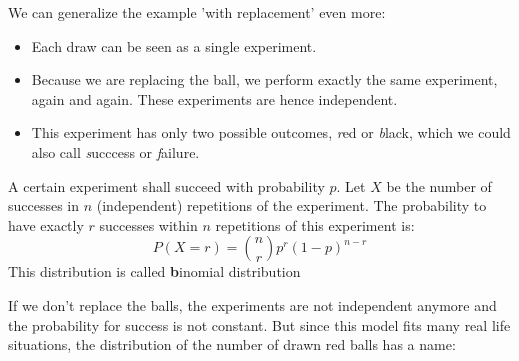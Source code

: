 \documentclass[twoside,11pt,a4paper]{article}
\newif\ifEN \ENtrue	                %
\def\tr|#1|#2|{\ifEN #2\else #1\fi}     %
\newenvironment{ttile}[1]{\begin{tcolorbox}[colback=tile,sharp corners,title=#1]}{\end{tcolorbox}}
\theoremstyle{definition}
\begin{document}
\par\bigskip\bigskip\bigskip\bigskip\bigskip
\tr|Wir können das Beispiel mit dem Zurücklegen der Kugeln sogar noch weiter verallgemeinern:
   |We can generalize the example 'with  replacement' even more:|
\begin{itemize}
\item \tr|Jedes Ziehen einer Kugel ist ein eigenständiges Experiment.  |Each draw can be seen as a single experiment.|
\item \tr|Weil wir die Kugel zurücklegen, führen wir jedesmal das gleiche Experiment durch. Die Experimente sind also voneinander unabhängig. 
         |Because we are replacing  the ball,  we perform exactly the same experiment, again and again. These experiments are hence independent. |
\item \tr|Das Experiment hat nur zwei mögliche Ausgänge, \emph{rot} oder \emph{schwarz}, die wir auch etwas allgemeiner \emph{Erfolg} oder \emph{Misserfolg} nennen könnten. 
         |This experiment has only two possible outcomes, \emph{red} or \emph{black}, which we could also call \emph{succcess} or \emph{failure}. |
\end{itemize}
\begin{ttile}{\tr|Binomialverteilung|Binomial Distribution|}
\tr|Ein Experiment habe die Erfolgswahrscheinlichkeit $p$. Sei $X$ die Anzahl Erfolge bei $n$ (unabhängigen) Wiederholungen des Experiments. 
    Die Wahrscheinlichkeit, dass wir bei $n$  Wiederholungen genau $r$ Erfolge haben ist:
   |A certain experiment shall succeed with probability $p$. Let $X$ be the number of successes in $n$ (independent) repetitions of the experiment.
    The probability to have exactly $r$ successes within $n$  repetitions of this experiment is:|
\[
P(X=r)= \binom{n}{r}p^r(1-p)^{n-r}
\]
\tr|Diese Verteilung heisst \textbf{Binomialverteilung}. |This distribution is called \textbf{binomial distribution}|
\end{ttile}
\par\bigskip
\tr|Legt man die Kugeln nicht zurück, so sind die Experimente nicht mehr unabhängig und die Erfolgeswahrscheinlichkeit ist nicht mehr konstant. 
Aber da dieses Modell auf viele reale Situationen passt hat die Verteilung der Anzahl gezogener roter Kugeln einen Namen: 
|If we don't replace the balls, the experiments are not independent anymore and the probability for success is not constant.  
But since this model fits many real life situations, the distribution of the number of drawn red balls has a name:| 
\end{document}
